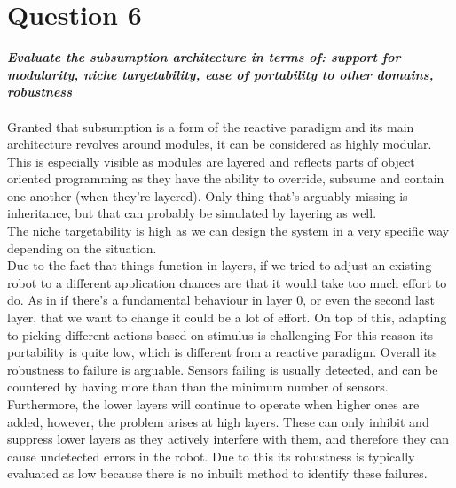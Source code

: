 \documentclass{article}
\newcommand\tab[1][1cm]{\hspace*{#1}}
\begin{document}
\section*{Question 6}
\textbf{\textit{
    \tab Evaluate  the  subsumption  architecture  in  terms  of:  support  for modularity, niche targetability, 
    ease of portability to other domains, robustness
}} \\ \\
Granted that subsumption is a form of the reactive paradigm and its main architecture revolves around modules, 
it can be considered as highly modular. This is especially visible as 
modules are layered and reflects parts of object oriented programming as they have the ability to override, 
subsume and contain one another (when they're layered). Only thing that's arguably missing is inheritance, but 
that can probably be simulated by layering as well. 
\\
\tab 
The niche targetability is high as we can design the system in a very specific way depending on the situation.
\\
\tab Due to the fact that things function in layers, if we tried to adjust an existing robot to a different application
chances are that it would take too much effort to do. As in if there's a fundamental behaviour in layer 0, or even
the second last layer, that we want to change it could be a lot of effort. On top of this, adapting to picking
different actions based on stimulus is challenging
For this reason its portability is quite low, which is different from a reactive paradigm. \cite{IntroToAI}
Overall its robustness to failure is arguable. Sensors failing is usually detected, and can be countered by having 
more than than the minimum number of sensors. Furthermore, the lower layers will continue to operate when higher ones
are added, however, the problem arises at high layers. These can only inhibit and suppress lower layers as they actively
interfere with them, and therefore they can cause undetected errors in the robot. Due to this its robustness is typically
evaluated as low because there is no inbuilt method to identify these failures. \cite{IntroToAI} \cite{reactiveParadigms}
\end{document}
